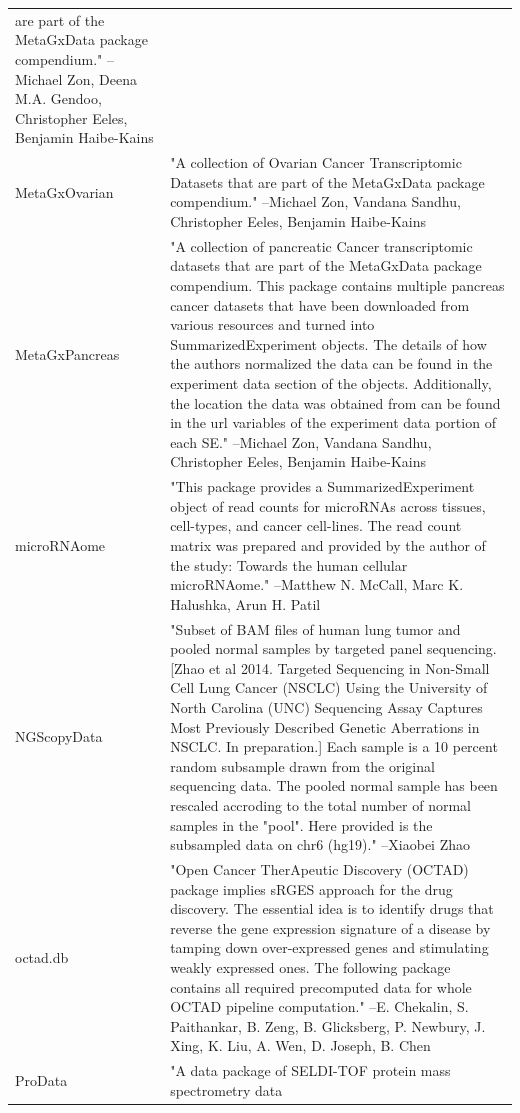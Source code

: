 \begin{longtable}[t]{l>{\raggedright\arraybackslash}p{25em}}
are part of the MetaGxData package compendium." --Michael Zon, Deena M.A. Gendoo, Christopher Eeles, Benjamin Haibe-Kains\\
MetaGxOvarian & "A collection of Ovarian Cancer Transcriptomic Datasets
that are part of the MetaGxData package compendium." --Michael Zon, Vandana Sandhu, Christopher Eeles, Benjamin Haibe-Kains\\
\addlinespace
MetaGxPancreas & "A collection of pancreatic Cancer transcriptomic datasets
that are part of the MetaGxData package compendium. This
package contains multiple pancreas cancer datasets that have
been downloaded from various resources and turned into
SummarizedExperiment objects. The details of how the authors
normalized the data can be found in the experiment data section
of the objects. Additionally, the location the data was
obtained from can be found in the url variables of the
experiment data portion of each SE." --Michael Zon, Vandana Sandhu, Christopher Eeles, Benjamin Haibe-Kains\\
microRNAome & "This package provides a SummarizedExperiment object of
read counts for microRNAs across tissues, cell-types, and
cancer cell-lines. The read count matrix was prepared and
provided by the author of the study: Towards the human cellular
microRNAome." --Matthew N. McCall, Marc K. Halushka, Arun H. Patil\\
NGScopyData & "Subset of BAM files of human lung tumor and pooled normal
samples by targeted panel sequencing. [Zhao et al 2014.
Targeted Sequencing in Non-Small Cell Lung Cancer (NSCLC) Using
the University of North Carolina (UNC) Sequencing Assay
Captures Most Previously Described Genetic Aberrations in
NSCLC. In preparation.] Each sample is a 10 percent random
subsample drawn from the original sequencing data. The pooled
normal sample has been rescaled accroding to the total number
of normal samples in the "pool". Here provided is the
subsampled data on chr6 (hg19)." --Xiaobei Zhao\\
octad.db & "Open Cancer TherApeutic Discovery (OCTAD) package implies
sRGES approach for the drug discovery. The essential idea is to
identify drugs that reverse the gene expression signature of a
disease by tamping down over-expressed genes and stimulating
weakly expressed ones. The following package contains all
required precomputed data for whole OCTAD pipeline computation." --E. Chekalin, S. Paithankar, B. Zeng, B. Glicksberg, P. Newbury, J. Xing, K. Liu, A. Wen, D. Joseph, B. Chen\\
ProData & "A data package of SELDI-TOF protein mass spectrometry data

\end{longtable}
